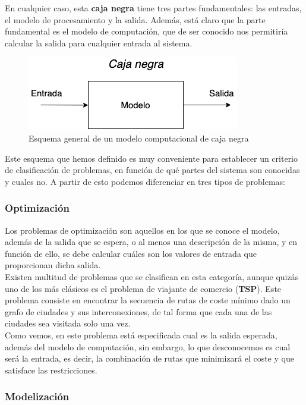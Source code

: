 En cualquier caso, esta \textbf{caja negra} tiene tres partes fundamentales: las entradas, el modelo de procesamiento y la salida. Además, está claro que la parte fundamental es el modelo de computación, que de ser conocido nos permitiría calcular la salida para cualquier entrada al sistema. \\

\begin{figure}[ht]
    \centering
    \includegraphics[scale=0.6]{mem/images/cap-1/1-1.png}
    \caption{Esquema general de un modelo computacional de caja negra}
    \label{fig:my_label}
\end{figure}

Este esquema que hemos definido es muy conveniente para establecer un criterio de clasificación de problemas, en función de qué partes del sistema son conocidas y cuales no. A partir de esto podemos diferenciar en tres tipos de problemas:

\subsubsection{Optimización}
Los problemas de optimización son aquellos en los que se conoce el modelo, además de la salida que se espera, o al menos una descripción de la misma, y en función de ello, se debe calcular cuáles son los valores de entrada que proporcionan dicha salida. \\

Existen multitud de problemas que se clasifican en esta categoría, aunque quizás uno de los más clásicos es el problema de viajante de comercio (\textbf{TSP}). Este problema consiste en encontrar la secuencia de rutas de coste mínimo dado un grafo de ciudades y sus interconexiones, de tal forma que cada una de las ciudades sea visitada solo una vez.\\

Como vemos, en este problema está especificada cual es la salida esperada, además del modelo de computación, sin embargo, lo que desconocemos es cual será la entrada, es decir, la combinación de rutas que minimizará el coste y que satisface las restricciones.

\subsubsection{Modelización}

